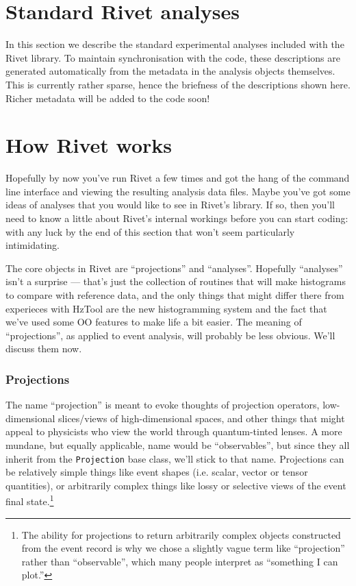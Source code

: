 \documentclass{JHEP3}
\newcommand{\kbd}[1]{\texttt{#1}\xspace}
\begin{document}
\cleardoublepage
\part{Standard Rivet analyses}
\label{part:analyses}


In this section we describe the standard experimental analyses included with the
Rivet library. To maintain synchronisation with the code, these descriptions are
generated automatically from the metadata in the analysis objects
themselves. This is currently rather sparse, hence the briefness of the
descriptions shown here. Richer metadata will be added to the code soon!





\cleardoublepage
\part{How Rivet works}
\label{part:writinganalyses}

Hopefully by now you've run Rivet a few times and got the hang of the command
line interface and viewing the resulting analysis data files. Maybe you've got
some ideas of analyses that you would like to see in Rivet's library. If so,
then you'll need to know a little about Rivet's internal workings before you can
start coding: with any luck by the end of this section that won't seem
particularly intimidating.

The core objects in Rivet are ``projections'' and ``analyses''. Hopefully
``analyses'' isn't a surprise --- that's just the collection of routines that
will make histograms to compare with reference data, and the only things that
might differ there from experieces with HzTool are the new histogramming system
and the fact that we've used some OO features to make life a bit easier. The
meaning of ``projections'', as applied to event analysis, will probably be less
obvious. We'll discuss them now.


\section{Projections}
The name ``projection'' is meant to evoke thoughts of
projection operators, low-dimensional slices/views of high-dimensional spaces,
and other things that might appeal to physicists who view the world through
quantum-tinted lenses. A more mundane, but equally applicable, name would be
``observables'', but since they all inherit from the \kbd{Projection} base
class, we'll stick to that name. Projections can be relatively simple things
like event shapes (i.e. scalar, vector or tensor quantities), or arbitrarily
complex things like lossy or selective views of the event final
state.\footnote{The ability for projections to return arbitrarily complex objects
  constructed from the event record is why we chose a slightly vague term like
  ``projection'' rather than ``observable'', which many people interpret as
  ``something I can plot.''}
\end{document}
